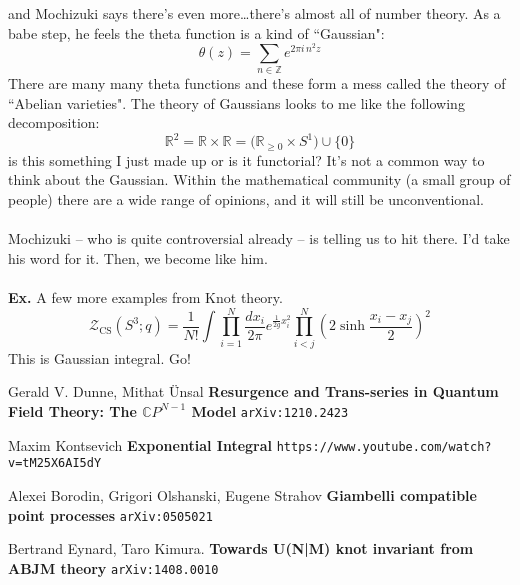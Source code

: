 \documentclass[12pt]{article}
\begin{document}
and Mochizuki says there's even more\dots there's almost all of number theory.  As a babe step, he feels the theta function is a kind of ``Gaussian":
$$ \theta(z) = \sum_{n \in \mathbb{Z}} e^{2\pi i \, n^2 z}  $$
There are many many theta functions and these form a mess called the theory of ``Abelian varieties".  The theory of Gaussians looks to me like the following decomposition:
$$ \mathbb{R}^2 = \mathbb{R} \times \mathbb{R} 
= \Big( \mathbb{R}_{\geq 0} \times S^1 \Big)  \cup \{ 0 \} $$
is this something I just made up or is it functorial?  It's not a common way to think about the Gaussian.  Within the mathematical community (a small group of people) there are a wide range of opinions, and it will still be unconventional. \\ \\
Mochizuki -- who is quite controversial already -- is telling us to hit there.  I'd take his word for it. Then, we become like him. \\ \\
\textbf{Ex.} A few more examples from Knot theory.
$$
\mathcal{Z}_{\text{CS}}(S^3; q)
= \frac{1}{N!} \int \prod_{i=1}^N
\frac{dx_i}{2\pi} e^{\frac{1}{2g}x_i^2}\prod_{i < j}^N \left( 2 \sinh \frac{x_i - x_j}{2} \right)^2 $$
This is Gaussian integral.  Go!
\vfill

\begin{thebibliography}{}

\item Gerald V. Dunne, Mithat \"{U}nsal  \textbf{Resurgence and Trans-series in Quantum Field Theory: The $\mathbb{C}P^{N-1}$ Model} \texttt{arXiv:1210.2423}

\item Maxim Kontsevich \textbf{Exponential Integral} \texttt{https://www.youtube.com/watch?v=tM25X6AI5dY}
 
\end{thebibliography}

\begin{thebibliography}{}

\item Alexei Borodin, Grigori Olshanski, Eugene Strahov \textbf{Giambelli compatible point processes}
\texttt{arXiv:0505021}

\item Bertrand Eynard, Taro Kimura. \textbf{Towards U(N|M) knot invariant from ABJM theory
}
\texttt{arXiv:1408.0010}

\end{thebibliography}

\newpage
\end{document}
